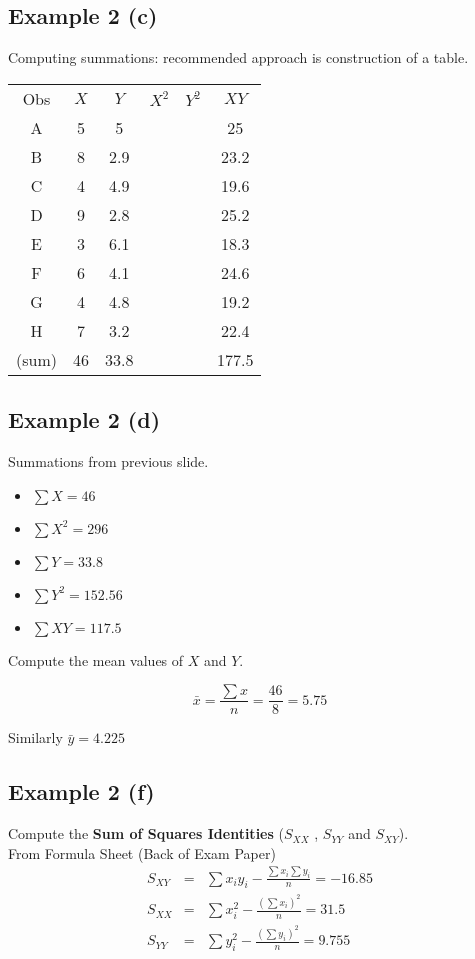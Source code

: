 \documentclass[]{report}
\begin{document}
\subsection{Example 2 (c)}
Computing summations: recommended approach is construction of a table.\\
\begin{center}
	\begin{tabular}{|c|c|c|c|c|c|}
		\hline
		Obs&$X$&$Y$&$X^2$&$Y^2$&$XY$\\
		A &5&5&&&25      \\
		B &8&2.9&&&23.2\\
		C &4&4.9&&&19.6\\
		D &9&2.8&&&25.2\\
		E &3&6.1&&&18.3\\
		F &6&4.1&&&24.6\\
		G &4&4.8&&&19.2\\
		H &7&3.2&&&22.4\\
		(sum)&46&33.8&&&177.5\\
		
		\hline
	\end{tabular}
\end{center}



\subsection{Example 2 (d)}

Summations from previous slide.
\begin{itemize}
	\item $\sum X = 46$
	\item $\sum X^2 =296$
	\item $\sum Y = 33.8$
	\item $\sum Y^2 = 152.56$
	\item $\sum XY = 117.5$
\end{itemize}
Compute the mean values of $X$ and $Y$.

\[ \bar{x} = \frac{\sum x}{n} = \frac{46}{8} = 5.75 \]

Similarly $\bar{y} =   4.225$



\subsection{Example 2 (f)}
Compute the \textbf{Sum of Squares Identities} ($S_{XX}$ , $S_{YY}$ and $S_{XY}$).\\
\bigskip
From Formula Sheet (Back of Exam Paper)
\begin{eqnarray*}
	S_{XY} &=&
	\sum x_iy_i - \frac{\sum x_i\sum y_i}{n} = -16.85\\
	S_{XX} &=&
	\sum x_i^2 - \frac{(\sum x_i)^2}{n} = 31.5\\
	S_{YY} &=&
	\sum y_i^2 - \frac{(\sum y_i)^2}{n} = 9.755\\
\end{eqnarray*}
\end{document}
